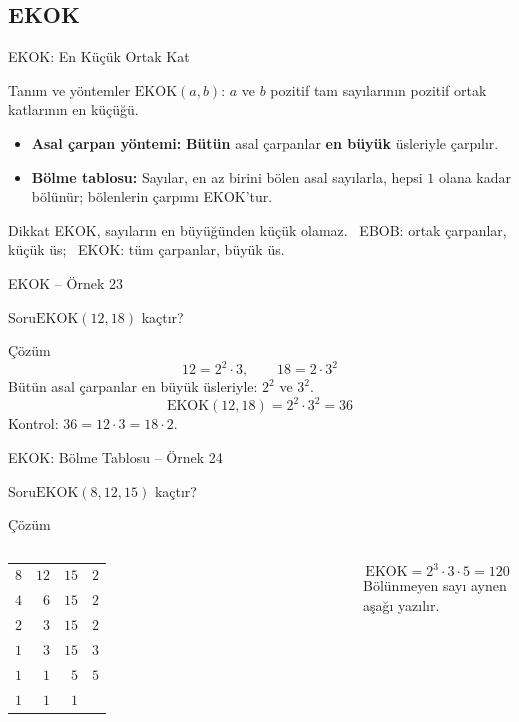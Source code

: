 \documentclass[aspectratio=169,11pt]{beamer}
\newcommand{\soru}[3]{%
\begin{frame}{#1}
  \begin{block}{Soru}\large #2\end{block}
  \pause
  \begin{exampleblock}{Çözüm}\large #3\end{exampleblock}
\end{frame}}
\begin{document}
\subsection{EKOK}
\begin{frame}{EKOK: En Küçük Ortak Kat}
\begin{block}{Tanım ve yöntemler}
\(\text{EKOK}(a,b)\): \(a\) ve \(b\) pozitif tam sayılarının pozitif ortak katlarının en küçüğü.
\begin{itemize}
\item \textbf{Asal çarpan yöntemi:} \textbf{Bütün} asal çarpanlar \textbf{en büyük} üsleriyle çarpılır.
\item \textbf{Bölme tablosu:} Sayılar, en az birini bölen asal sayılarla, hepsi \(1\) olana kadar bölünür; bölenlerin çarpımı EKOK'tur.
\end{itemize}
\end{block}
\begin{alertblock}{Dikkat}
EKOK, sayıların en büyüğünden küçük olamaz. \ EBOB: ortak çarpanlar, küçük üs; \ EKOK: tüm çarpanlar, büyük üs.
\end{alertblock}
\end{frame}

\soru{EKOK -- Örnek 23}
{\(\text{EKOK}(12,18)\) kaçtır?}
{\[12=2^2\cdot 3,\qquad 18=2\cdot 3^2\]
Bütün asal çarpanlar en büyük üsleriyle: \(2^2\) ve \(3^2\).
\[\text{EKOK}(12,18)=2^2\cdot 3^2=36\]
Kontrol: \(36=12\cdot 3=18\cdot 2\).}

\soru{EKOK: Bölme Tablosu -- Örnek 24}
{\(\text{EKOK}(8,12,15)\) kaçtır?}
{\begin{columns}[c]
\column{0.45\textwidth}
{\normalsize
\begin{tabular}{rrr|l}
\(8\) & \(12\) & \(15\) & \(2\)\\
\(4\) & \(6\) & \(15\) & \(2\)\\
\(2\) & \(3\) & \(15\) & \(2\)\\
\(1\) & \(3\) & \(15\) & \(3\)\\
\(1\) & \(1\) & \(5\) & \(5\)\\
\(1\) & \(1\) & \(1\) &
\end{tabular}}
\column{0.5\textwidth}
\[\text{EKOK}=2^3\cdot 3\cdot 5=120\]
Bölünmeyen sayı aynen aşağı yazılır.
\end{columns}}
\end{document}
